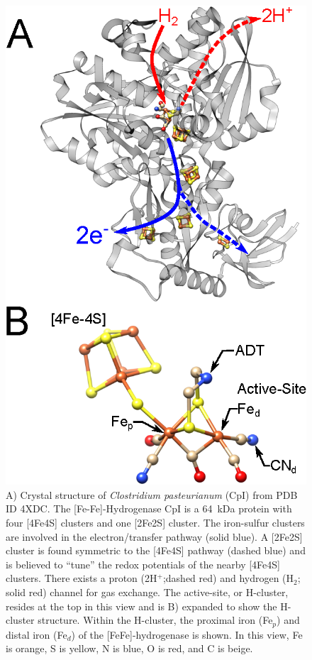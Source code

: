 \begin{figure}[htpb]
\centering
\includegraphics{Kapitel/Ch1-images/CpI-geometry.eps}
\caption[Crystal structure of {\em Clostridium pasteurianum} (CpI).]{A) Crystal structure of {\em Clostridium pasteurianum} (CpI) from PDB ID 4XDC. The [Fe-Fe]-Hydrogenase CpI is a 64~kDa protein with four [4Fe4S] clusters and one [2Fe2S] cluster. The iron-sulfur  clusters  are involved  in  the electron\-/transfer  pathway (solid blue). A [2Fe2S] cluster is found symmetric to the [4Fe4S] pathway (dashed blue) and is believed to ``tune'' the redox potentials of the nearby [4Fe4S] clusters. There exists a proton (2H$^+$;dashed red) and hydrogen (H$_2$; solid red) channel for gas exchange. The active-site, or H-cluster, resides at the top in this view and is B) expanded to show the H-cluster structure. Within the H-cluster, the proximal iron (Fe$_p$) and distal iron (Fe$_d$) of the [FeFe]-hydrogenase is shown. In this view, Fe is orange, S is yellow, N is blue, O is red, and C is beige.}
 \label{fig:CpIGeo}
\end{figure}

